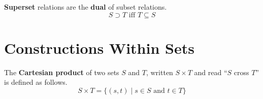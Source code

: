 \documentclass[11pt]{article}
\begin{document}
		\textbf{Superset} relations are the \textbf{dual} of subset relations.
		\begin{equation}
			S\supset T \text{ iff } T\subseteq S
		\end{equation}
		
\section{Constructions Within Sets}
	The \textbf{Cartesian product} of two sets $S$ and $T$, written $S\times T$ and read ``$S$ cross $T$'' is defined as follows.
	\begin{equation}
		S\times T = \{(s,t)\mid s\in S \text{ and } t\in T\}
	\end{equation}

%		
%		


\end{document}
